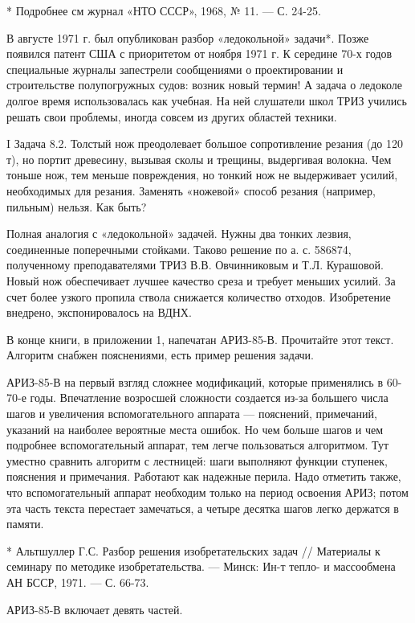 * Подробнее см журнал «НТО СССР», 1968, № 11. — С. 24-25.


В августе 1971 г. был  опубликован разбор «ледокольной» задачи*. Позже
появился патент  США с приоритетом от  ноября 1971 г. К  середине 70-х
годов специальные  журналы запестрели  сообщениями о  проектировании и
строительстве  полупогружных судов:  возник новый  термин! А  задача о
ледоколе  долгое время  использовалась как  учебная. На  ней слушатели
школ  ТРИЗ  учились решать  свои  проблемы,  иногда совсем  из  других
областей техники.

I Задача  8.2. Толстый нож преодолевает  большое сопротивление резания
(до 120 т),  но портит древесину, вызывая сколы  и трещины, выдергивая
волокна.  Чем тоньше  нож, тем  меньше повреждения,  но тонкий  нож не
выдерживает усилий, необходимых для резания. Заменять «ножевой» способ
резания (например, пильным) нельзя. Как быть?

Полная  аналогия с  «ледокольной»  задачей. Нужны  два тонких  лезвия,
соединенные  поперечными стойками.  Таково  решение по  а. с.  586874,
полученному преподавателями  ТРИЗ В.В. Овчинниковым и  Т.Л. Курашовой.
Новый нож обеспечивает лучшее качество среза и требует меньших усилий.
За  счет более  узкого  пропила ствола  снижается количество  отходов.
Изобретение внедрено, экспонировалось на ВДНХ.


В конце  книги, в приложении  1, напечатан АРИЗ-85-В.  Прочитайте этот
текст. Алгоритм снабжен пояснениями, есть пример решения задачи.

АРИЗ-85-В на первый взгляд  сложнее модификаций, которые применялись в
60-70-е годы. Впечатление возросшей сложности создается из-за большего
числа  шагов  и  увеличения  вспомогательного  аппарата  —  пояснений,
примечаний, указаний на наиболее вероятные места ошибок. Но чем больше
шагов и чем подробнее  вспомогательный аппарат, тем легче пользоваться
алгоритмом. Тут уместно сравнить  алгоритм с лестницей: шаги выполняют
функции  ступенек,  пояснения  и  примечания.  Работают  как  надежные
перила.  Надо отметить  также, что  вспомогательный аппарат  необходим
только  на период  освоения  АРИЗ; потом  эта  часть текста  перестает
замечаться, а четыре десятка шагов легко держатся в памяти.

* Альтшуллер  Г.С. Разбор решения изобретательских  задач // Материалы
к  семинару  по методике  изобретательства.  —  Минск: Ин-т  тепло-  и
массообмена АН БССР, 1971. — С. 66-73.


АРИЗ-85-В включает девять частей.

